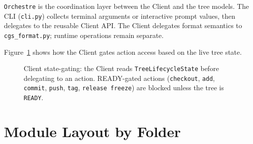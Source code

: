 \texttt{Orchestre} is the coordination layer between the Client and the tree
models. The CLI (\texttt{cli.py}) collects terminal arguments or interactive
prompt values, then delegates to the reusable Client API. The Client delegates
format semantics to \texttt{cgs\_format.py}; runtime operations remain
separate.

Figure~\ref{fig:client-gating} shows how the Client gates action access based
on the live tree state.

\begin{figure}[ht]
\centering
\caption{Client state-gating: the Client reads \texttt{TreeLifecycleState}
  before delegating to an action.  READY-gated actions (\texttt{checkout},
  \texttt{add}, \texttt{commit}, \texttt{push}, \texttt{tag},
  \texttt{release freeze}) are blocked unless the tree is \texttt{READY}.}
\label{fig:client-gating}

\end{figure}

\section{Module Layout by Folder}
\label{sec:module-layout}

